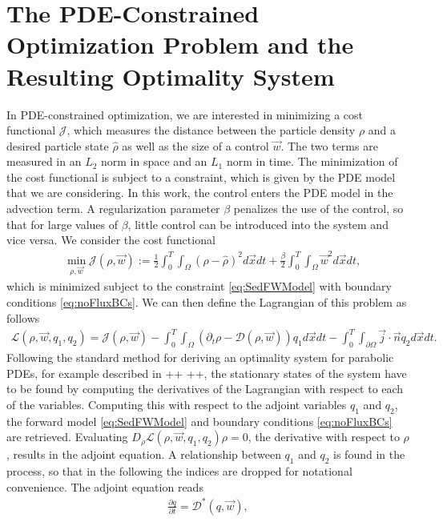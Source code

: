 \documentclass[final]{siamltex}
\newcommand{\adj}{q}
\newcommand{\w}{\vec{w}}
\newcommand{\n}{\vec{n}}
\newcommand{\x}{\vec{x}}
\newcommand{\hr}{\widehat \rho}
\begin{document}
\section{The PDE-Constrained Optimization Problem and the Resulting Optimality System}\label{sec:OCP} 
In PDE-constrained optimization, we are interested in minimizing a cost functional $\mathcal J$, which measures the distance between the particle density $\rho$ and a desired particle state $\hr$ as well as the size of a control $\w$. The two terms are measured in an $L_2$ norm in space and an $L_1$ norm in time. The minimization of the cost functional is subject to a constraint, which is given by the PDE model that we are considering. In this work, the control enters the PDE model in the advection term. A regularization parameter $\beta$ penalizes the use of the control, so that for large values of $\beta$, little control can be introduced into the system and vice versa. 
We consider the cost functional
\begin{align}\label{eq:OCP1}
	& \min_{\rho,\w}\mathcal J(\rho, \w) := \frac{1}{2}\int_0^T \int_\Omega (\rho - \widehat \rho)^2 d\x dt + \frac{\beta}{2} \int_0^T\int_\Omega \w^2 d\x dt,
\end{align}
which is minimized subject to the constraint \eqref{eq:SedFWModel} with boundary conditions \eqref{eq:noFluxBCs}.
We can then define the Lagrangian of this problem as follows
\begin{align*}
	\mathcal{L} (\rho,\w,\adj_1, \adj_2) = \mathcal J(\rho, \w) - \int_0^T \int_\Omega \left( \partial_t \rho - \mathcal{D}(\rho,\w) \right) \adj_1 d\x dt - \int_0^T \int_{\partial \Omega} \vec j \cdot \n \adj_2  d\x dt.
\end{align*}
Following the standard method for deriving an optimality system for parabolic PDEs, for example described in ++ ++, the stationary states of the system have to be found by computing the derivatives of the Lagrangian with respect to each of the variables. Computing this with respect to the adjoint variables $\adj_1$ and $\adj_2$, the forward model \eqref{eq:SedFWModel} and boundary conditions \eqref{eq:noFluxBCs} are retrieved. Evaluating $D_\rho \mathcal{L} (\rho,\w,\adj_1, \adj_2)\rho = 0$, the derivative with respect to $\rho$, results in the adjoint equation. A relationship between $\adj_1$ and $\adj_2$ is found in the process, so that in the following the indices are dropped for notational convenience.
The adjoint equation reads
\begin{align}\label{eq:SedAdjointEq}
	\frac{\partial q}{\partial t} = \mathcal{D}^*(\adj,\w),
\end{align}
\end{document}
